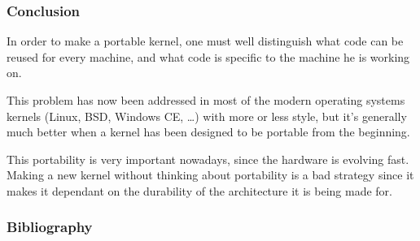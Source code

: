 \begin{frame}
  \frametitle{Conclusion}

  In order to make a portable kernel, one must well distinguish what code can be reused for every machine, and what code is specific to the machine he is working on.

  \-

  This problem has now been addressed in most of the modern operating systems kernels (Linux, BSD, Windows CE, \ldots) with more or less style, but it's generally much better when a kernel has been designed to be portable from the beginning.

  \-

  This portability is very important nowadays, since the hardware is evolving fast. Making a new kernel without thinking about portability is a bad strategy since it makes it dependant on the durability of the architecture it is being made for.

  
\end{frame}


%
%

\begin{frame}[allowframebreaks]
  \frametitle{Bibliography}

  
  
\end{frame}


